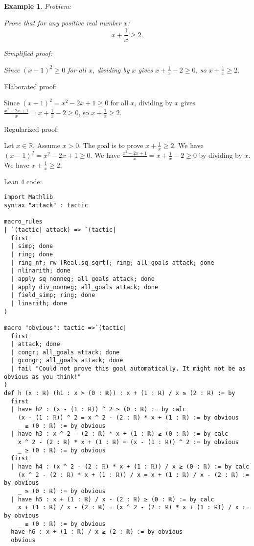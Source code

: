 \documentclass{article}
\newtheorem{example}{Example}
\begin{document}
\begin{example}
Problem:
\begin{tcolorbox}[colback=yellow!10, width=\linewidth]
Prove that for any positive real number $x$:
    $$x + \frac{1}{x} \geq 2.$$
\end{tcolorbox}

Simplified proof:
\begin{tcolorbox}[colback=blue!10, width=\linewidth]
Since $(x-1)^2 \ge 0$ for all $x$, dividing by $x$ gives $x + \frac{1}{x} - 2 \ge 0$, so $x + \frac{1}{x} \ge 2$.
\end{tcolorbox}
\end{example}

Elaborated proof:
\begin{tcolorbox}[colback=green!10, width=\linewidth]
Since $(x-1)^2 = x^2 - 2x + 1 \ge 0$ for all $x$, dividing by $x$ gives $\frac{x^2 - 2x + 1}{x} = x + \frac{1}{x} - 2 \ge 0$, so $x + \frac{1}{x} \ge 2$.
\end{tcolorbox}

Regularized proof:
\begin{tcolorbox}[colback=red!10, width=\linewidth]
Let $x\in\mathbb{R}$. Assume $x>0$.
The goal is to prove $x + \frac{1}{x} \ge 2$.
We have ${\left(x-1\right)}^2 = x^2 - 2x + 1 \ge 0$.
We have $\frac{x^2 - 2x + 1}{x} = x + \frac{1}{x} - 2 \ge 0$ by dividing by $x$.
We have $x + \frac{1}{x} \ge 2$.
\end{tcolorbox}

Lean 4 code:
\begin{tcolorbox}[colback=white!10, width=\linewidth]
\begin{lstlisting}[language=Lean4]
import Mathlib
syntax "attack" : tactic

macro_rules
| `(tactic| attack) => `(tactic|
  first
  | simp; done
  | ring; done
  | ring_nf; rw [Real.sq_sqrt]; ring; all_goals attack; done
  | nlinarith; done
  | apply sq_nonneg; all_goals attack; done
  | apply div_nonneg; all_goals attack; done
  | field_simp; ring; done
  | linarith; done
)

macro "obvious": tactic =>`(tactic|
  first
  | attack; done
  | congr; all_goals attack; done
  | gcongr; all_goals attack; done
  | fail "Could not prove this goal automatically. It might not be as obvious as you think!"
)
def h (x : ℝ) (h1 : x > (0 : ℝ)) : x + (1 : ℝ) / x ≥ (2 : ℝ) := by
  first
  | have h2 : (x - (1 : ℝ)) ^ 2 ≥ (0 : ℝ) := by calc
    (x - (1 : ℝ)) ^ 2 = x ^ 2 - (2 : ℝ) * x + (1 : ℝ) := by obvious
    _ ≥ (0 : ℝ) := by obvious
  | have h3 : x ^ 2 - (2 : ℝ) * x + (1 : ℝ) ≥ (0 : ℝ) := by calc
    x ^ 2 - (2 : ℝ) * x + (1 : ℝ) = (x - (1 : ℝ)) ^ 2 := by obvious
    _ ≥ (0 : ℝ) := by obvious
  first
  | have h4 : (x ^ 2 - (2 : ℝ) * x + (1 : ℝ)) / x ≥ (0 : ℝ) := by calc
    (x ^ 2 - (2 : ℝ) * x + (1 : ℝ)) / x = x + (1 : ℝ) / x - (2 : ℝ) := by obvious
    _ ≥ (0 : ℝ) := by obvious
  | have h5 : x + (1 : ℝ) / x - (2 : ℝ) ≥ (0 : ℝ) := by calc
    x + (1 : ℝ) / x - (2 : ℝ) = (x ^ 2 - (2 : ℝ) * x + (1 : ℝ)) / x := by obvious
    _ ≥ (0 : ℝ) := by obvious
  have h6 : x + (1 : ℝ) / x ≥ (2 : ℝ) := by obvious
  obvious

\end{lstlisting}
\end{tcolorbox}
\end{document}

